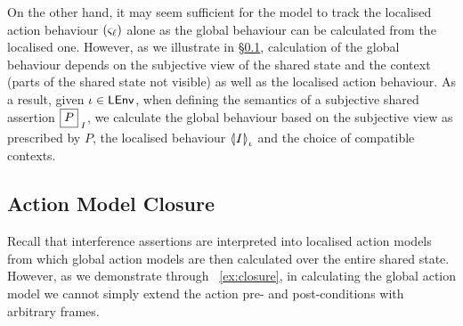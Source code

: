 On the other hand, it may seem sufficient for the model to track the localised action behaviour $(\amod{\ell})$ alone as the global behaviour can be calculated from the localised one. However, as we illustrate in \S\ref{subsec:amodClosure}, calculation of the global behaviour depends on the subjective view of the shared state and the context (parts of the shared state not visible) as well as the localised action behaviour. As a result, given $\lenv \in \LEnv$, when defining the semantics of a subjective shared assertion $\shared{P}{I}$, we calculate the global behaviour based on the subjective view as prescribed by $P$, the localised behaviour $\semI[\lenv]{I}$ and the choice of compatible contexts. 
%
%
\subsection{Action Model Closure}\label{subsec:amodClosure}
Recall that interference assertions are interpreted into localised action models from which global action models are then calculated over the entire shared state. However, as we demonstrate through \ex~\ref{ex:closure}, in calculating the global action model we cannot simply extend the action pre- and post-conditions with arbitrary frames. 
%
